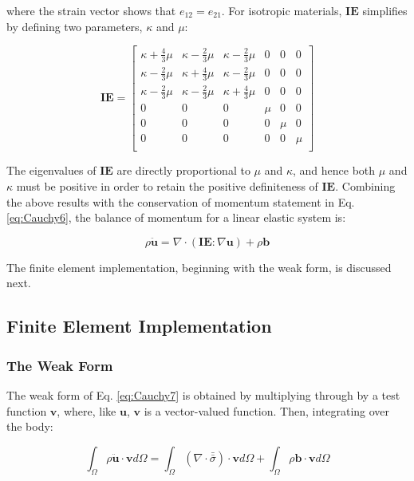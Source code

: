 \documentclass[10pt]{article}
\begin{document}
where the strain vector shows that \(e_{12}=e_{21}\). For isotropic materials, \(\textbf{IE}\) simplifies by defining two parameters, \(\kappa\) and \(\mu\):

\begin{equation}
\textbf{IE}=\begin{bmatrix}\kappa+\frac{4}{3}\mu & \kappa-\frac{2}{3}\mu & \kappa-\frac{2}{3}\mu & 0 & 0 & 0\\
\kappa-\frac{2}{3}\mu & \kappa+\frac{4}{3}\mu & \kappa-\frac{2}{3}\mu & 0 & 0 & 0\\
\kappa-\frac{2}{3}\mu & \kappa-\frac{2}{3}\mu & \kappa+\frac{4}{3}\mu & 0 & 0 & 0\\
0 & 0 & 0 & \mu & 0 & 0\\
0 & 0 & 0 & 0 & \mu & 0\\
0 & 0 & 0 & 0 & 0 & \mu\\
\end{bmatrix}
\end{equation}

The eigenvalues of \(\textbf{IE}\) are directly proportional to \(\mu\) and \(\kappa\), and hence both \(\mu\) and \(\kappa\) must be positive in order to retain the positive definiteness of \(\textbf{IE}\). Combining the above results with the conservation of momentum statement in Eq. \eqref{eq:Cauchy6}, the balance of momentum for a linear elastic system is:

\begin{equation}
\label{eq:Cauchy7}
\rho\ddot{\textbf{u}}=\nabla\cdot(\textbf{IE}:\nabla \textbf{u})+\rho\textbf{b}
\end{equation}

The finite element implementation, beginning with the weak form, is discussed next.

\subsection{Finite Element Implementation}

\subsubsection{The Weak Form}

The weak form of Eq. \eqref{eq:Cauchy7} is obtained by multiplying through by a test function \(\textbf{v}\), where, like \(\textbf{u}\), \(\textbf{v}\) is a vector-valued function. Then, integrating over the body:

\begin{equation}
\label{eq:StrongForm2}
\int_{\Omega}\rho\ddot{\textbf{u}}\cdot \textbf{v}d\Omega=\int_{\Omega}(\nabla\cdot\bar{\bar{\sigma}})\cdot\textbf{v}d\Omega+\int_{\Omega}\rho\textbf{b}\cdot\textbf{v}d\Omega
\end{equation}
\end{document}
